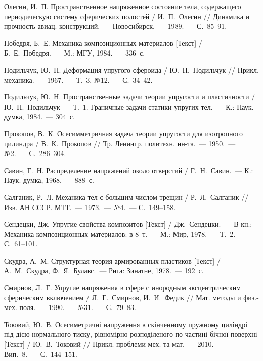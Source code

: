 \begin{biblist}{99}
Олегин, И.~П. 
Пространственное напряженное состояние тела, содержащего периодическую систему сферических полостей 
/ И.~П.~Олегин 
// Динамика и прочность авиац. конструкций.~--- Новосибирск.~--- 1989.~--- С.~85--91.

Победря, Б.~Е. 
Механика композиционных материалов [Текст] 
/ Б.~Е.~Победря.~--- М.: МГУ, 1984.~--- 336~с.

Подильчук, Ю.~Н. 
Деформация упругого сфероида 
/ Ю.~Н.~Подильчук 
// Прикл. механика.~--- 1967.~--- Т.~3, №12.~--- С.~34--42.

Подильчук, Ю.~Н. 
Пространственные задачи теории упругости и пластичности 
/ Ю.~Н.~Подильчук~--- Т.~1. Граничные задачи статики упругих тел.~--- К.: Наук. думка, 1984.~--- 304~с.

Прокопов, В.~К. 
Осесимметричная задача теории упругости для изотропного цилиндра 
/ В.~К.~Прокопов 
// Тр. Ленингр. политехн. ин-та.~--- 1950.~--- №2.~--- С.~286--304.

Савин, Г.~Н. 
Распределение напряжений около отверстий 
/ Г.~Н.~Савин.~--- К.: Наук. думка, 1968.~--- 888~с.

Салганик, Р.~Л. 
Механика тел с большим числом трещин  
/ Р.~Л.~Салганик 
// Изв. АН СССР. МТТ.~--- 1973.~--- №4.~--- С.~149--158.

Сендецки, Дж. 
Упругие свойства композитов [Текст] 
/ Дж.~Сендецки.~--- В кн.: Механика композиционных материалов: в 8~т.~--- М.: Мир, 1978.~--- Т.~2.~--- С.~61--101.

Скудра, А.~М. 
Структурная теория армированных пластиков [Текст] 
/ А.~М.~Скудра, Ф.~Я.~Булавс.~--- Рига: Зинатне, 1978.~--- 192~с.

Смирнов, Л.~Г. 
Упругие напряжения в сфере с инородным эксцентрическим сферическим включением 
/ Л.~Г.~Смирнов,  И.~И.~Федик 
// Мат. методы и физ.-мех. поля.~--- 1990.~--- №31.~--- С.~79--83.


Токовий, Ю.~В. 
Осесиметричні напруження в скінченному пружному циліндрі під дією нормального тиску, рівномірно розподіленого по частині бічної поверхні [Текст] 
/ Ю.~В.~Токовий 
// Прикл. проблеми мех. та мат.~--- 2010.~--- Вип.~8.~--- С.~144--151.


\end{biblist}
